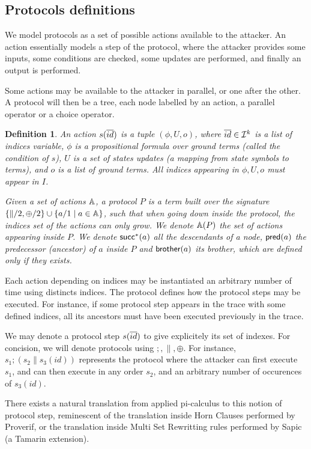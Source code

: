 \documentclass[a4paper]{article}
\newtheorem{definition}{Definition}
\theoremstyle{remark}
\begin{document}
\subsection{Protocols definitions}
We  model protocols as a set of possible actions available to the
attacker. An action essentially models a step of the protocol, where
the attacker provides some inputs, some conditions are checked, some
updates are performed, and finally an output is performed.

Some actions may be available to the attacker in parallel, or one
after the other. A protocol will then be a tree, each node labelled by an action, a parallel operator or a choice operator.

\begin{definition}
An action $s(\overline{id})$ is a tuple $(\phi,U,o)$, where $\overline{id} \in \mathcal{I}^k$ is a list of indices variable, $\phi$ is a propositional formula over ground terms (called the condition of $s$), $U$ is a set of states updates (a mapping from state symbols to terms), and $o$ is a list of ground terms.
All indices appearing in $\phi,U,o$ must appear in $I$.

Given a set of actions $\mathbb{A}$, a protocol $P$ is a term built over the signature $\{\|/2,\oplus/2\} \cup \{a/1 \mid a \in \mathbb{A}\}$, such that when going down inside the protocol, the indices set of the actions can only grow. We denote $\mathbb{A}(P)$ the set of actions appearing inside $P$. We denote $\textsf{succ}^*(a)$ all the descendants of a node, $\textsf{pred}(a)$ the predecessor (ancestor) of $a$ inside $P$ and $\textsf{brother}(a)$ its brother, which are defined only if they exists.
\end{definition}

Each action depending on indices may be instantiated an arbitrary number of time using distincts indices. The protocol defines how the protocol steps may be executed. For instance, if some protocol step appears in
the trace with some defined indices, all its ancestors must have been executed previously in the trace.

We may denote a protocol step $s(\overline{id})$ to give explicitely its set of indexes.
For concision, we will denote protocols using $;,\|,\oplus$. For instance, $s_1; (s_2 \| s_3(id))$ represents the protocol where the attacker can first execute $s_1$, and can then execute in any order $s_2$, and an arbitrary number of occurences of $s_3(id)$.

There exists a natural translation from applied pi-calculus to this notion of protocol step, reminescent of the translation inside Horn Clauses performed by Proverif, or the translation inside Multi Set Rewritting rules performed by Sapic (a Tamarin extension).
\end{document}

